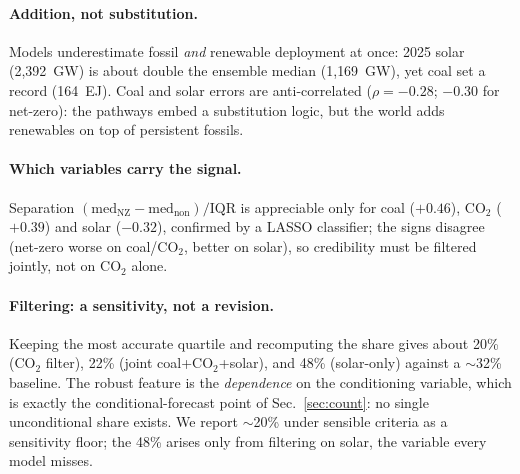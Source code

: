 \documentclass[sigconf, nonacm]{acmart}
\begin{document}
\paragraph{Addition, not substitution.}
Models underestimate fossil \emph{and} renewable deployment at once: 2025 solar (2{,}392~GW) is about double the ensemble median (1{,}169~GW), yet coal set a record (164~EJ). Coal and solar errors are anti-correlated ($\rho=-0.28$; $-0.30$ for net-zero): the pathways embed a substitution logic, but the world adds renewables on top of persistent fossils.

\paragraph{Which variables carry the signal.}
Separation $(\text{med}_{\text{NZ}}-\text{med}_{\text{non}})/\text{IQR}$ is appreciable only for coal ($+0.46$), CO$_2$ ($+0.39$) and solar ($-0.32$), confirmed by a LASSO classifier; the signs disagree (net-zero worse on coal/CO$_2$, better on solar), so credibility must be filtered jointly, not on CO$_2$ alone.

\paragraph{Filtering: a sensitivity, not a revision.}
Keeping the most accurate quartile and recomputing the share gives about 20\% (CO$_2$ filter), 22\% (joint coal+CO$_2$+solar), and 48\% (solar-only) against a $\sim$32\% baseline. The robust feature is the \emph{dependence} on the conditioning variable, which is exactly the conditional-forecast point of Sec.~\ref{sec:count}: no single unconditional share exists. We report $\sim$20\% under sensible criteria as a sensitivity floor; the 48\% arises only from filtering on solar, the variable every model misses.

\end{document}
